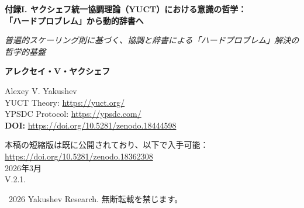 \documentclass[12pt,a4paper]{article}
\begin{document}
	
	\begin{titlepage}
		\begin{center}
			\vspace*{0cm}
			
			\Huge\textbf{付録I. ヤクシェフ統一協調理論（YUCT）における意識の哲学：\\「ハードプロブレム」から動的辞書へ}
			
			\vspace{1cm}
			
			\small\textit{普遍的スケーリング則に基づく、協調と辞書による「ハードプロブレム」解決の哲学的基盤}
			
			\vspace{0.5cm}
			
			\small\textbf{アレクセイ・V・ヤクシェフ}
			
			\vspace{0.5cm}
			\Large
			Alexey V. Yakushev\\
			
			YUCT Theory: \url{https://yuct.org/}\\
			YPSDC Protocol: \url{https://ypsdc.com/}\\
			
			\vspace{1cm}
			\textbf{DOI:} \url{https://doi.org/10.5281/zenodo.18444598}\\
			
			\vspace{0.5cm}
			
			\vspace{0cm}
			\large 
			本稿の短縮版は既に公開されており、以下で入手可能：\\ \url{https://doi.org/10.5281/zenodo.18362308}\\
			\vspace{1cm}
			2026年3月 \\ \large V.2.1.
			
			\vspace{4cm}
			\textcopyright~2026 Yakushev Research. 無断転載を禁じます。
			
			\newpage
			
			\begin{abstract}
				\noindent
				本論文は、統一協調理論（YUCT）の枠組みの中で「意識のハードプロブレム」を解決するための哲学的基盤を提供する。意識は、エピフェノメノンや幻想としてではなく、\textbf{内的辞書の階層}を通じて実装される\textbf{動的協調プロセス}として理解される。古典的な「脳–意識」二元論が、\textbf{遺伝的}、\textbf{神経的}、\textbf{文化的辞書}という三層モデルを通じて克服されることを示す。主観的経験は、共有された意味空間を用いた神経アンサンブル間の\textbf{ライブ協調}の結果として解釈される。メタ辞書（自らの状態を省察する能力）は、自己性の現象を説明する。
				

\end{abstract}
\end{center}
\end{titlepage}
\end{document}
